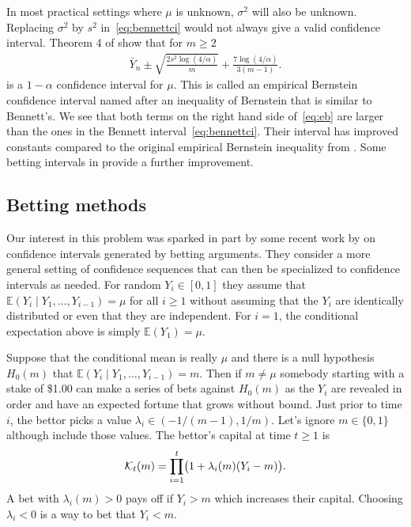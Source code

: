 \documentclass{article}
\renewcommand{\ge}{\geqslant}
\newcommand{\e}{\mathbb{E}}
\newcommand{\giv}{\!\mid\!} %
\begin{document}
In most practical settings where $\mu$ is unknown,
$\sigma^2$ will also be unknown. Replacing $\sigma^2$
by $s^2$ in~\eqref{eq:bennettci} would not always
give a valid confidence interval.  
Theorem 4 of \cite{maurer2009empirical} show that
for $m\ge2$
\begin{align}\label{eq:eb}
    \bar Y_n\pm
\sqrt{\frac{2s^2\log(4/\alpha)}m}
+ \frac{7\log(4/\alpha)}{3(m-1)}.
\end{align}
is a $1-\alpha$ confidence interval for $\mu$.
This is called an empirical Bernstein confidence
interval named after an inequality of Bernstein
that is similar to Bennett's.  We see that both terms
on the right hand side of~\eqref{eq:eb} are larger
than the ones in the Bennett interval~\eqref{eq:bennettci}.
Their interval has improved constants compared to the original
empirical Bernstein inequality from
\cite{audi:muno:szep:2007}. Some betting intervals
in \cite{WauRam24a} provide a further improvement.





\subsection{Betting methods}

Our interest in this problem was sparked in part by some recent
work by \cite{WauRam24a} on confidence intervals generated
by betting arguments.  They consider a more general setting
of confidence sequences that can then be specialized to
confidence intervals as needed.  
For random $Y_i\in[0,1]$ they assume
that $\e(Y_i\giv Y_1,\dots,Y_{i-1})=\mu$ for all $i\ge1$ 
without assuming
that the $Y_i$ are identically distributed or even that
they are independent. For $i=1$, the conditional expectation 
above is simply $\e(Y_1)=\mu$.

Suppose that the conditional mean is really $\mu$ and 
there is a null hypothesis $H_0(m)$ that
$\e(Y_i\giv Y_1,\dots, Y_{i-1})=m$. Then if $m\ne\mu$
somebody starting with a stake of \$1.00 can
make a series of bets against $H_0(m)$
as the $Y_i$ are revealed in order
and have an expected fortune that grows without bound.
Just prior to time $i$, the bettor picks a value
$\lambda_i\in(-1/(m-1),1/m)$. Let's ignore $m\in\{0,1\}$
although \cite{WauRam24a} include those values. The bettor's
capital at time $t\ge1$ is
$$
\mathcal{K}_t(m)= \prod_{i=1}^t\bigl(1+\lambda_i(m)(Y_i-m)\bigr).
$$
A bet with $\lambda_i(m)>0$ pays off if $Y_i>m$ which
increases their capital. Choosing $\lambda_i<0$ is a 
way to bet that $Y_i<m$.
\end{document}
